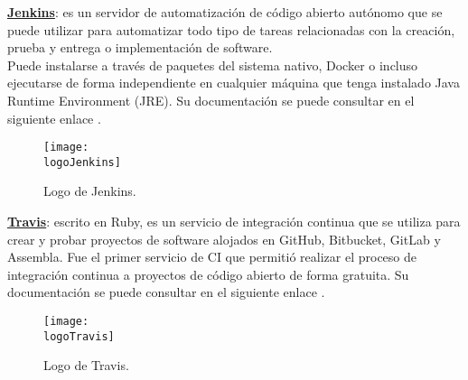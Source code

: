 \begin{compactitem}
    \item \textbf{\underline{Jenkins}}: es un servidor de automatización de código abierto autónomo que se puede utilizar para automatizar todo tipo de tareas relacionadas con la creación, prueba y entrega o implementación de software.\\
    Puede instalarse a través de paquetes del sistema nativo, Docker o incluso ejecutarse de forma independiente en cualquier máquina que tenga instalado Java Runtime Environment (JRE). Su documentación se puede consultar en el siguiente enlace \cite{jenkins}.
    \begin{figure}[h]
        \centering
        \texttt{[image: \\logoJenkins]}
        \caption{Logo de Jenkins.}
    \end{figure}
    \item \textbf{\underline{Travis}}: escrito en Ruby, es un servicio de integración continua que se utiliza para crear y probar proyectos de software alojados en GitHub, Bitbucket, GitLab y Assembla. Fue el primer servicio de CI que permitió realizar el proceso de integración continua a proyectos de código abierto de forma gratuita. Su documentación se puede consultar en el siguiente enlace \cite{travisCI}.
    
    \begin{figure}[h]
        \centering
        \texttt{[image: \\logoTravis]}
        \caption{Logo de Travis.}
    \end{figure}
    

\end{compactitem}
